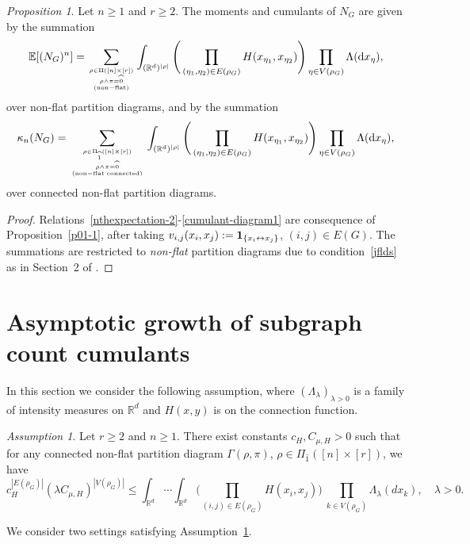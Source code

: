 \documentclass[bj,authoryear,noshowframe]{imsart}
\theoremstyle{plain}
\theoremstyle{remark}
\newcommand{\E}{\mathbb{E}}
\newcommand{\R}{\mathbb{R}}
\newcommand{\bone}{{\bf 1}}
\def\real{{\mathord{\mathbb R}}}
\newtheorem{prop}{Proposition}[section]
\newtheorem{assumption}{Assumption}[section]
\begin{document}
 \begin{prop}
  \label{lma-diagram1}
   Let $n \geq 1$ and $r\geq 2$.
   The moments and cumulants of $N_G$ are given by the summation 
 \begin{equation} 
 \label{nthexpectation-2} 
 \E [(N_G)^n] =
 \sum_{\rho \in \Pi ( [n] \times [r] )
   \atop {
     \rho \wedge \pi = \widehat{0}
     \atop
         {\rm (non-flat)}
   }
 }
 \int_{(\R^d )^{|\rho |}}
 \Bigg(
 \prod_{(\eta_1,\eta_2) \in E(\rho_G)}
 H(x_{\eta_1},x_{\eta_2})
 \Bigg)
 \prod_{\eta \in V(\rho_G)}
 \Lambda (\mathrm{d}x_\eta ), 
 \end{equation} 
  over non-flat partition diagrams, and by the summation   
 \begin{equation}
   \label{cumulant-diagram1}
   \kappa_n(N_G)=\sum_{\rho \in \Pi_{\widehat{1}} ( [n] \times [r])
     \atop
     {\rho \wedge \pi = \widehat{0}
     \atop {\rm (non-flat \ \! connected)}}
   }
   \int_{(\R^d )^{|\rho |}}
   \Bigg(
 \prod_{(\eta_1,\eta_2) \in E(\rho_G)}
 H(x_{\eta_1},x_{\eta_2})
 \Bigg)
 \prod_{\eta \in V(\rho_G)}
 \Lambda (\mathrm{d}x_\eta ), 
 \end{equation} 
  over connected non-flat partition diagrams. 
 \end{prop}
 \begin{proof}
  Relations~\eqref{nthexpectation-2}-\eqref{cumulant-diagram1}
  are consequence of Proposition~\ref{p01-1}, after taking
   $v_{i,j}(x_i,x_j):=\bone_{\{x_i\leftrightarrow x_j\}}$,
   $(i,j)\in E(G)$.
   The summations are restricted to {\em non-flat} partition diagrams
   due to condition~\eqref{jflds} as in Section~2 of \cite{prkhp}. 
 \end{proof}
 \vspace{-0.1cm}
 \section{Asymptotic growth of subgraph count cumulants}
 \label{s6}
 \vspace{-0.1cm}
 \noindent 
 In this section we consider the following assumption,
 where $(\Lambda_\lambda)_{\lambda >0}$ is a family 
 of intensity measures on $\real^d$ and $H(x,y)$ is
 on the connection function.
 \begin{assumption}
 \label{a61} 
  Let $r\geq 2$ and $n \geq 1$.
  There exist constants $c_H, C_{\mu , H} > 0$
  such that 
  for any connected non-flat partition diagram $\Gamma(\rho ,\pi )$, 
  $\rho \in \Pi_{\widehat{1}} ( [n] \times [r])$, we have 
 \begin{equation}
 \label{integ-connecting3}
   c_H^{|E(\rho_G)|} ( \lambda C_{\mu , H} )^{|V(\rho_G)|}
 \leq     \int_{\R^d}\cdots\int_{\R^d}
 \Bigg(
 \prod_{(i,j)\in E(\rho_G) }H(x_i,x_j)
 \Bigg)
 \
 \prod_{k\in V(\rho_G) } \Lambda_\lambda (dx_k),
 \quad \lambda >0. 
 \end{equation}
 \end{assumption}
  We consider two settings satisfying Assumption~\ref{a61}.
 
\end{document}
